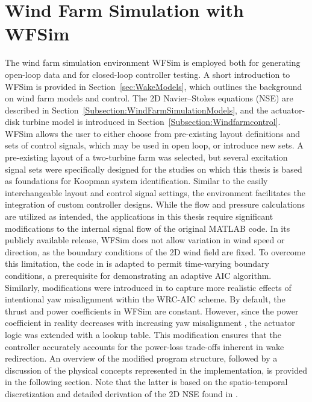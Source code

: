 \section{Wind Farm Simulation with WFSim} \label{sec:WindFarmSimulationWFSim}
The wind farm simulation environment WFSim \cite{boersma2017tutorial} is employed both for generating open-loop data and for closed-loop controller testing. A short introduction to WFSim is provided in Section~\ref{sec:WakeModels}, which outlines the background on wind farm models and control. The 2D Navier–Stokes equations (NSE) are described in Section~\ref{Subsection:WindFarmSimulationModels}, and the actuator-disk turbine model is introduced in Section~\ref{Subsection:Windfarmcontrol}. WFSim allows the user to either choose from pre-existing layout definitions and sets of control signals, which may be used in open loop, or introduce new sets. A pre-existing layout of a two-turbine farm was selected, but several excitation signal sets were specifically designed for the studies on which this thesis is based as foundations for Koopman system identification. Similar to the easily interchangeable layout and control signal settings, the environment facilitates the integration of custom controller designs. While the flow and pressure calculations are utilized as intended, the applications in this thesis require significant modifications to the internal signal flow of the original MATLAB code.
In its publicly available release, WFSim does not allow variation in wind speed or direction, as the boundary conditions of the 2D wind field are fixed. To overcome this limitation, the code in \cite{dittmer2022data} is adapted to permit time-varying boundary conditions, a prerequisite for demonstrating an adaptive AIC algorithm. Similarly, modifications were introduced in \cite{dittmer2023koopman} to capture more realistic effects of intentional yaw misalignment within the WRC-AIC scheme. By default, the thrust and power coefficients in WFSim are constant. However, since the power coefficient in reality decreases with increasing yaw misalignment \cite{hulsman2022turbine}, the actuator logic was extended with a lookup table. This modification ensures that the controller accurately accounts for the power-loss trade-offs inherent in wake redirection. An overview of the modified program structure, followed by a discussion of the physical concepts represented in the implementation, is provided in the following section. Note that the latter is based on the spatio-temporal discretization and detailed derivation of the 2D NSE found in \cite{boersma2018control}.

